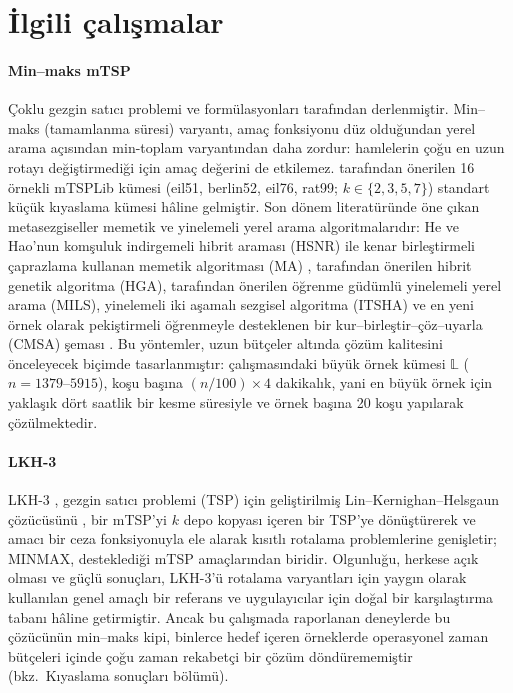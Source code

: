 \section{İlgili çalışmalar}\label{sec:related}

\paragraph{Min--maks mTSP} Çoklu gezgin satıcı problemi ve
formülasyonları \citet{bektas2006} tarafından derlenmiştir. Min--maks (tamamlanma süresi) varyantı,
amaç fonksiyonu düz olduğundan yerel arama açısından min-toplam varyantından daha zordur:
hamlelerin çoğu en uzun rotayı değiştirmediği için amaç değerini de
etkilemez. \citet{necula2015} tarafından önerilen 16 örnekli
mTSPLib kümesi (eil51, berlin52, eil76, rat99;
$k\in\{2,3,5,7\}$) standart küçük kıyaslama kümesi hâline gelmiştir. Son dönem literatüründe öne çıkan
metasezgiseller memetik ve yinelemeli yerel arama algoritmalarıdır: He ve Hao'nun
komşuluk indirgemeli hibrit araması (HSNR) \citep{hehao2022} ile kenar birleştirmeli
çaprazlama kullanan memetik algoritması (MA) \citep{hehao2023},
\citet{mahmoudinazlou2024} tarafından önerilen hibrit genetik algoritma (HGA),
\citet{hehaoxia2024} tarafından önerilen öğrenme güdümlü
yinelemeli yerel arama (MILS), yinelemeli
iki aşamalı sezgisel algoritma (ITSHA) \citep{zheng2022} ve en yeni örnek olarak
pekiştirmeli öğrenmeyle desteklenen bir kur--birleştir--çöz--uyarla (CMSA) şeması \citep{rodriguez2026}.
Bu yöntemler, uzun bütçeler altında çözüm kalitesini önceleyecek biçimde tasarlanmıştır:
\citet{hehaoxia2024} çalışmasındaki büyük örnek kümesi $\mathbb{L}$ ($n=1379$--$5915$),
koşu başına $(n/100)\times 4$ dakikalık, yani en büyük örnek için yaklaşık dört
saatlik bir kesme süresiyle ve örnek başına 20 koşu yapılarak çözülmektedir.

\paragraph{LKH-3} LKH-3 \citep{helsgaun2017}, gezgin satıcı problemi (TSP) için geliştirilmiş
Lin--Kernighan--Helsgaun çözücüsünü \citep{helsgaun2000}, bir mTSP'yi $k$ depo kopyası içeren
bir TSP'ye dönüştürerek ve amacı bir ceza fonksiyonuyla ele alarak kısıtlı rotalama
problemlerine genişletir; MINMAX, desteklediği mTSP amaçlarından biridir. Olgunluğu,
herkese açık olması ve güçlü sonuçları, LKH-3'ü rotalama varyantları için yaygın olarak kullanılan
genel amaçlı bir referans ve uygulayıcılar için doğal bir karşılaştırma tabanı
hâline getirmiştir. Ancak bu çalışmada raporlanan deneylerde bu çözücünün min--maks kipi, binlerce hedef içeren
örneklerde operasyonel zaman bütçeleri içinde çoğu zaman rekabetçi bir çözüm
döndürememiştir (bkz.\ Kıyaslama sonuçları bölümü).


